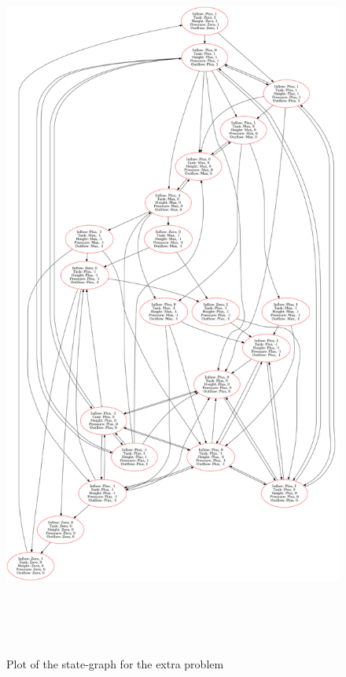 \documentclass[a4paper]{article}
\begin{document}
\begin{figure}[H]\label{state-graph-extra}
	\centering
	\includegraphics[width=\textwidth,height=9.5in,keepaspectratio]{result_extra_problem.png}
	\caption{Plot of the state-graph for the extra problem}
\end{figure}
\end{document}
